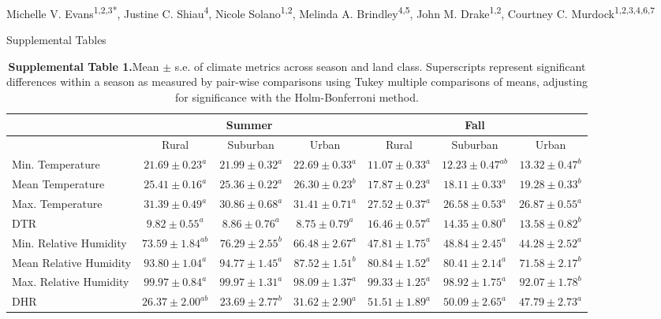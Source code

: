 \documentclass[12pt]{article}
\begin{document}
{\Large
\textbf{}}

\bigskip

Michelle V. Evans\textsuperscript{1,2,3*},
Justine C. Shiau\textsuperscript{4},
Nicole Solano\textsuperscript{1,2},
Melinda A. Brindley\textsuperscript{4,5},
John M. Drake\textsuperscript{1,2},
Courtney C. Murdock\textsuperscript{1,2,3,4,6,7}
\smallskip

{\Large{Supplemental Tables}}

\newpage

\begin{landscape}

	\begin{table}[]
	\centering
	\caption{\textbf{Supplemental Table 1.}Mean $\pm$ s.e. of climate metrics across season and land class. Superscripts represent significant differences within a season as measured by pair-wise comparisons using Tukey multiple comparisons of means, adjusting for significance with the Holm-Bonferroni method.}
	\begin{tabular}{l|ccc|ccc}
	                       & \multicolumn{3}{c}{Summer}                            & \multicolumn{3}{c}{Fall}                              \\
	\hline
	                       & Rural            & Suburban        & Urban            & Rural            & Suburban         & Urban           \\
	\hline
	Min. Temperature       & $21.69 \pm 0.23^a$  & $21.99 \pm 0.32^a$ & $22.69 \pm 0.33^a$  & $11.07 \pm 0.33^a$  & $12.23 \pm 0.47^{ab}$ & $13.32 \pm 0.47^b$ \\
	Mean Temperature       & $25.41 \pm 0.16^a$  & $25.36 \pm 0.22^a$ & $26.30 \pm 0.23^b$  & $17.87 \pm 0.23^a$  & $18.11 \pm 0.33^a$  & $19.28 \pm 0.33^b$ \\
	Max. Temperature       & $31.39 \pm 0.49^a$  & $30.86 \pm 0.68^a$ & $31.41 \pm 0.71^a$  & $27.52 \pm 0.37^a$  & $26.58 \pm 0.53^a$  & $26.87 \pm 0.55^a$ \\
	DTR                    & $9.82 \pm 0.55^a$   & $8.86 \pm 0.76^a$  & $8.75 \pm 0.79^a$   & $16.46 \pm 0.57^a$  & $14.35 \pm 0.80^a$  & $13.58 \pm 0.82^b$ \\
	Min. Relative Humidity & $73.59 \pm 1.84^{ab}$ & $76.29 \pm 2.55^b$ & $66.48 \pm 2.67^a$  & $47.81 \pm 1.75^a$  & $48.84 \pm 2.45^a$  & $44.28 \pm 2.52^a$ \\
	Mean Relative Humidity & $93.80 \pm 1.04^a$ & $94.77 \pm 1.45^a$ & $87.52 \pm 1.51^b$ & $80.84  \pm 1.52^a$ & $80.41 \pm 2.14^a$  & $71.58 \pm 2.17^b$ \\
	Max. Relative Humidity & $99.97 \pm 0.84^a$  & $99.97 \pm 1.31^a$ & $98.09 \pm 1.37^a$  & $99.33 \pm 1.25^a$  & $98.92 \pm 1.75^a$  & $92.07 \pm 1.78^b$ \\
	DHR                    & $26.37 \pm 2.00^{ab}$ & $23.69 \pm 2.77^b$ & $31.62 \pm 2.90^a$  & $51.51 \pm 1.89^a$  & $50.09 \pm 2.65^a$  & $47.79 \pm 2.73^a$
	\end{tabular}
	\end{table}


\end{landscape}
\end{document}
